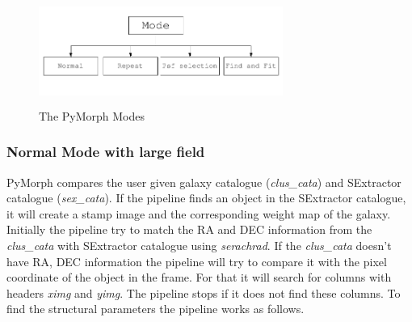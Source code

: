 \documentclass[a4paper,10pt]{article}
\begin{document}
 \begin{figure}%
 \centering
 \includegraphics[width=8cm, height=3.5cm, bb=0 0 641 234]{pipeline-arch1.png}
 \caption{The PyMorph Modes}
 \label{fig:arch1}
\end{figure}


% 
% 


\subsubsection{Normal Mode with large field}
\label{normal}
PyMorph compares the user given galaxy catalogue (\textit{clus\_cata}) and SExtractor catalogue (\textit{sex\_cata}). If the pipeline finds an object in the SExtractor catalogue, it will create a stamp image and the corresponding weight map of the galaxy. Initially the pipeline try to match the RA and DEC information from the \textit{clus\_cata} with SExtractor catalogue using \textit{serachrad}. If the \textit{clus\_cata} doesn't have RA, DEC information the pipeline will try to compare it with the pixel coordinate of the object in the frame. For that it will search for columns with headers \textit{ximg} and \textit{yimg}. The pipeline stops if it does not find these columns. To find the structural parameters the pipeline works as follows.
\end{document}
